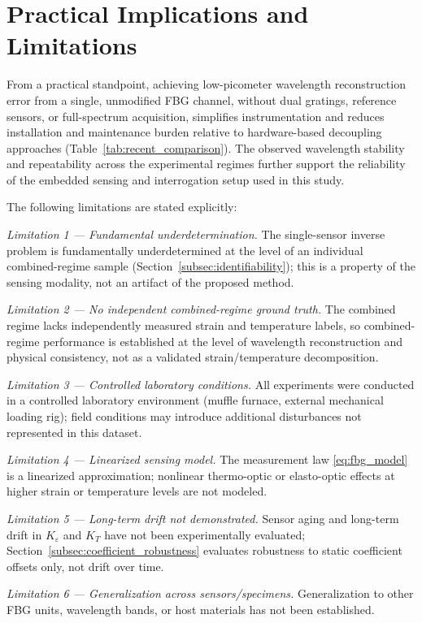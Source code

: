 \documentclass[journal,twoside,web]{ieeecolor}
\begin{document}
\section{Practical Implications and Limitations}
\label{sec:limitations}

From a practical standpoint, achieving low-picometer wavelength
reconstruction error from a single, unmodified FBG channel, without dual
gratings, reference sensors, or full-spectrum acquisition, simplifies
instrumentation and reduces installation and maintenance burden relative to
hardware-based decoupling approaches (Table~\ref{tab:recent_comparison}).
The observed wavelength stability and repeatability across the experimental
regimes further support the reliability of the embedded sensing and
interrogation setup used in this study.

The following limitations are stated explicitly:

\emph{Limitation 1 --- Fundamental underdetermination.} The single-sensor
inverse problem is fundamentally underdetermined at the level of an
individual combined-regime sample (Section~\ref{subsec:identifiability});
this is a property of the sensing modality, not an artifact of the proposed
method.

\emph{Limitation 2 --- No independent combined-regime ground truth.} The
combined regime lacks independently measured strain and temperature labels,
so combined-regime performance is established at the level of wavelength
reconstruction and physical consistency, not as a validated
strain/temperature decomposition.

\emph{Limitation 3 --- Controlled laboratory conditions.} All experiments
were conducted in a controlled laboratory environment (muffle furnace,
external mechanical loading rig); field conditions may introduce additional
disturbances not represented in this dataset.

\emph{Limitation 4 --- Linearized sensing model.} The measurement law
\eqref{eq:fbg_model} is a linearized approximation; nonlinear thermo-optic
or elasto-optic effects at higher strain or temperature levels are not
modeled.

\emph{Limitation 5 --- Long-term drift not demonstrated.} Sensor aging and
long-term drift in $K_\varepsilon$ and $K_T$ have not been experimentally
evaluated; Section~\ref{subsec:coefficient_robustness} evaluates robustness
to static coefficient offsets only, not drift over time.

\emph{Limitation 6 --- Generalization across sensors/specimens.}
Generalization to other FBG units, wavelength bands, or host materials has
not been established.
\end{document}
